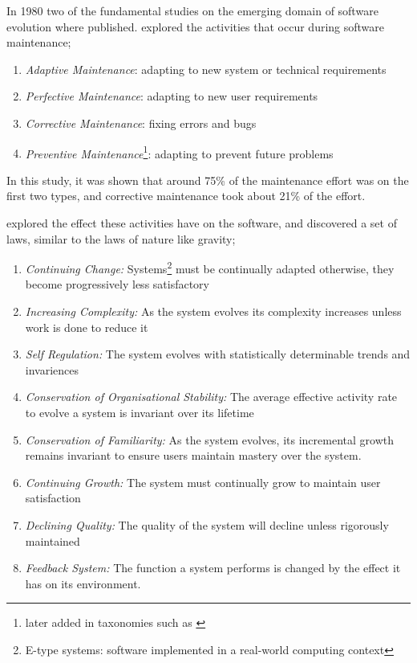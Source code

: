 In 1980 two of the fundamental studies on the emerging domain of software evolution where published.
\cite{Lientz1980} explored the activities that occur during software maintenance;
\begin{enumerate}
	\item \textit{Adaptive Maintenance}: adapting to new system or technical requirements
	\item \textit{Perfective Maintenance}: adapting to new user requirements
	\item \textit{Corrective Maintenance}: fixing errors and bugs
	\item \textit{Preventive Maintenance}\footnote{later added in taxonomies such as \citep{iee1990ieee}}: adapting to prevent future problems
\end{enumerate} 

In this study, it was shown that around 75\% of the maintenance effort was on the first two types, and corrective maintenance took about 21\% of the effort.

\cite{lehman1980} explored the effect these activities have on the software, and discovered a set of laws, similar to the laws of nature like gravity;

\begin{enumerate}
  \item \textit{Continuing Change:} Systems\footnote{E-type systems: software implemented in a real-world computing context} must be continually adapted 
  otherwise, they become progressively less satisfactory
  \item \textit{Increasing Complexity:} As the system evolves its complexity increases unless work is done to reduce it
  \item \textit{Self Regulation:} The system evolves with statistically determinable trends and invariences
  \item \textit{Conservation of Organisational Stability:} The average effective activity rate to evolve a system is invariant over its lifetime
  \item \textit{Conservation of Familiarity:} As the system evolves, its incremental growth remains invariant to ensure users maintain mastery over the system.
  \item \textit{Continuing Growth:} The system must continually grow to maintain user satisfaction
  \item \textit{Declining Quality:} The quality of the system will decline unless rigorously maintained
  \item \textit{Feedback System:} The function a system performs is changed by the effect it has on its environment.
\end{enumerate}

